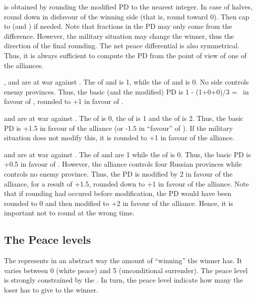  is obtained by rounding the modified PD to
the nearest integer. In case of halves, round down in disfavour of the winning
side (that is, round toward 0). Then cap to  (and ) if
needed.
\bparag Note that fractions in the PD may only come from the \STAB
difference. However, the military situation may change the winner, thus the
direction of the final rounding.
\bparag The net peace differential is also symmetrical. Thus, it is always
sufficient to compute the PD from the point of view of one of the alliances.

\begin{exemple}[Rounding PD]
  \SUE, \POL and \TUR are at war against \RUS. The \STAB of \RUS and \SUE is
  1, while the \STAB of \POL and \TUR is 0. No side controls enemy
  provinces. Thus, the basic (and the modified) PD is 1 - (1+0+0)/3 = \td\ in
  favour of \RUS, rounded to +1 in favour of \RUS.
  
  \smallskip

  \SUE and \TUR are at war against \RUS. The \STAB of \RUS is 0, the \STAB of
  \TUR is 1 and the \STAB of \SUE is 2. Thus, the basic PD is +1.5 in favour
  of the alliance (or -1.5 in ``favour'' of \RUS). If the military situation
  does not modify this, it is rounded to +1 in favour of the alliance.

  \smallskip

  \SUE and \TUR are at war against \RUS. The \STAB of \RUS and \TUR are 1
  while the \STAB of \SUE is 0. Thus, the basic PD is +0.5 in favour of
  \RUS. However, the alliance controls four Russian provinces while \RUS
  controls no enemy province. Thus, the PD is modified by 2 in favour of the
  alliance, for a result of +1.5, rounded down to +1 in favour of the
  alliance. Note that if rounding had occured before modification, the PD
  would have been rounded to 0 and then modified to +2 in favour of the
  alliance. Hence, it is important not to round at the wrong time.
\end{exemple}

\subsection{The Peace levels}
The  represents in an abstract way the amount of
``winning'' the winner has. It varies between 0 (white peace) and 5
(unconditional surrender). The peace level is strongly constrained by the
. In turn, the peace level indicate how many
 the loser has to give to the winner.

